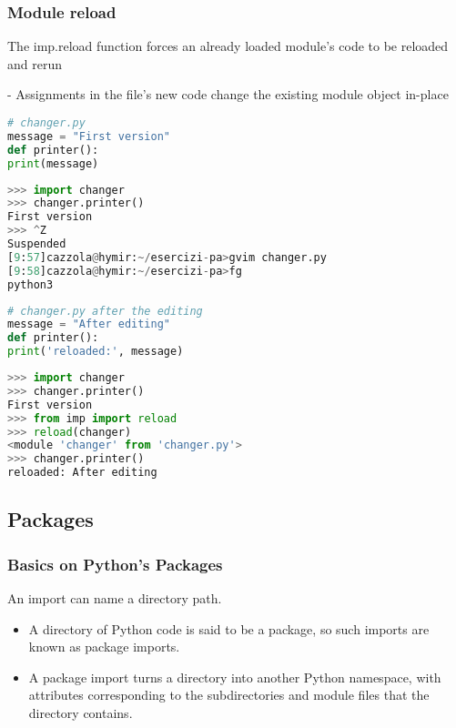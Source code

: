 \subsubsection{Module reload}

The imp.reload function forces an already loaded module’s code to be reloaded and rerun

- Assignments in the file’s new code change the existing module object in-place

\begin{lstlisting}[language=Python]
# changer.py
message = "First version"
def printer():
print(message)
\end{lstlisting}

\begin{lstlisting}[language=Python]
>>> import changer
>>> changer.printer()
First version
>>> ^Z
Suspended
[9:57]cazzola@hymir:~/esercizi-pa>gvim changer.py
[9:58]cazzola@hymir:~/esercizi-pa>fg
python3
\end{lstlisting}

\begin{lstlisting}[language=Python]
# changer.py after the editing
message = "After editing"
def printer():
print('reloaded:', message)
\end{lstlisting}

\begin{lstlisting}[language=Python]
>>> import changer
>>> changer.printer()
First version
>>> from imp import reload
>>> reload(changer)
<module 'changer' from 'changer.py'>
>>> changer.printer()
reloaded: After editing
\end{lstlisting}

\subsection{Packages}

\subsubsection{Basics on Python’s Packages}

An import can name a directory path.
\begin{itemize}
  \item A directory of Python code is said to be a package, so such imports are known as package imports.
  \item A package import turns a directory into another Python namespace, with attributes corresponding to the subdirectories and module files that the directory contains. 
\end{itemize}

